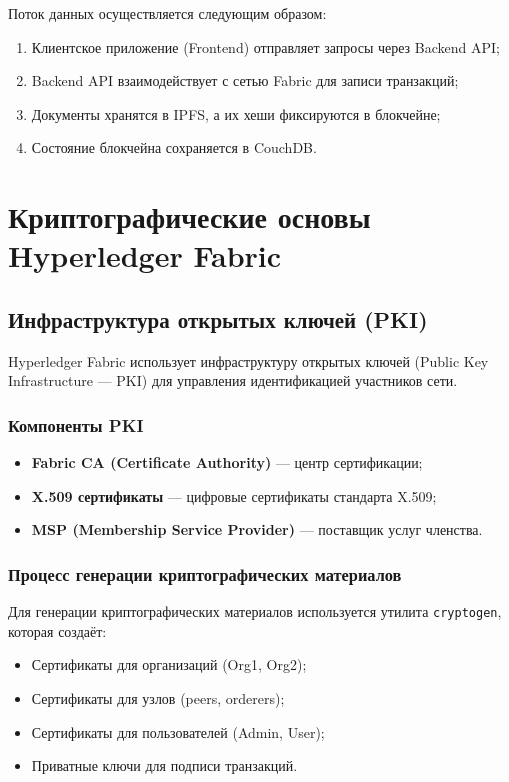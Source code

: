 \documentclass[a4paper,14pt]{extreport}
\begin{document}
Поток данных осуществляется следующим образом:
\begin{enumerate}
    \item Клиентское приложение (Frontend) отправляет запросы через Backend API;
    \item Backend API взаимодействует с сетью Fabric для записи транзакций;
    \item Документы хранятся в IPFS, а их хеши фиксируются в блокчейне;
    \item Состояние блокчейна сохраняется в CouchDB.
\end{enumerate}

\newpage

\chapter{Криптографические основы Hyperledger Fabric}

\section{Инфраструктура открытых ключей (PKI)}

Hyperledger Fabric использует инфраструктуру открытых ключей (Public Key Infrastructure --- PKI) для управления идентификацией участников сети.

\subsection{Компоненты PKI}

\begin{itemize}
    \item \textbf{Fabric CA (Certificate Authority)} --- центр сертификации;
    \item \textbf{X.509 сертификаты} --- цифровые сертификаты стандарта X.509;
    \item \textbf{MSP (Membership Service Provider)} --- поставщик услуг членства.
\end{itemize}

\subsection{Процесс генерации криптографических материалов}

Для генерации криптографических материалов используется утилита \texttt{cryptogen}, которая создаёт:
\begin{itemize}
    \item Сертификаты для организаций (Org1, Org2);
    \item Сертификаты для узлов (peers, orderers);
    \item Сертификаты для пользователей (Admin, User);
    \item Приватные ключи для подписи транзакций.
\end{itemize}
\end{document}

